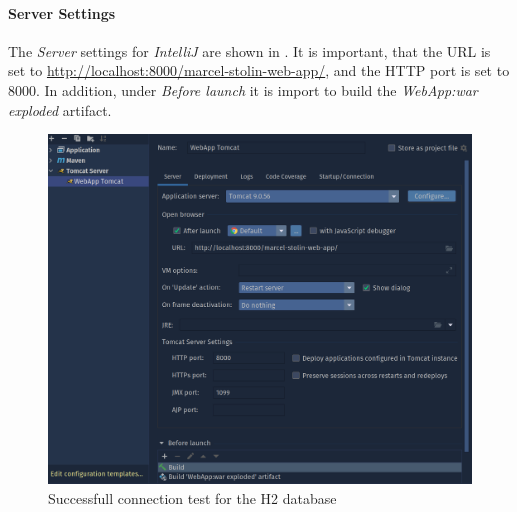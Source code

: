 \paragraph{Server Settings}
The \textit{Server} settings for \textit{IntelliJ} are shown in . It is important, that the URL is set to \url{http://localhost:8000/marcel-stolin-web-app/}, and the HTTP port is set to 8000. In addition, under \textit{Before launch} it is import to build the \textit{WebApp:war exploded} artifact.
\begin{figure}[h]
\centering
\includegraphics[scale=0.2]{images/03_depl/tomcat-config-1}
\caption{Successfull connection test for the H2 database}
\label{fig:03_depl_webapp_intellij_config1}
\end{figure}

